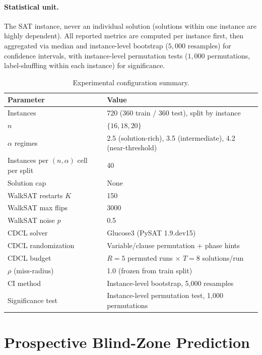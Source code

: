 \documentclass[11pt]{article}
\theoremstyle{definition}
\theoremstyle{remark}
\begin{document}
\paragraph{Statistical unit.} The SAT instance, never an individual solution (solutions within one instance are highly dependent). All reported metrics are computed per instance first, then aggregated via median and instance-level bootstrap ($5{,}000$ resamples) for confidence intervals, with instance-level permutation tests ($1{,}000$ permutations, label-shuffling within each instance) for significance.

\begin{table}[htbp]
\centering
\caption{Experimental configuration summary.}
\label{tab:config}
\begin{tabular}{@{}ll@{}}
\toprule
Parameter & Value \\
\midrule
Instances & 720 (360 train / 360 test), split by instance \\
$n$ & $\{16, 18, 20\}$ \\
$\alpha$ regimes & 2.5 (solution-rich), 3.5 (intermediate), 4.2 (near-threshold) \\
Instances per $(n,\alpha)$ cell per split & 40 \\
Solution cap & None \\
WalkSAT restarts $K$ & 150 \\
WalkSAT max flips & 3000 \\
WalkSAT noise $p$ & 0.5 \\
CDCL solver & Glucose3 (PySAT 1.9.dev15) \\
CDCL randomization & Variable/clause permutation + phase hints \\
CDCL budget & $R=5$ permuted runs $\times$ $T=8$ solutions/run \\
$\rho$ (miss-radius) & 1.0 (frozen from train split) \\
CI method & Instance-level bootstrap, 5{,}000 resamples \\
Significance test & Instance-level permutation test, 1{,}000 permutations \\
\bottomrule
\end{tabular}
\end{table}

\section{Prospective Blind-Zone Prediction}
\label{sec:prediction}
\end{document}
